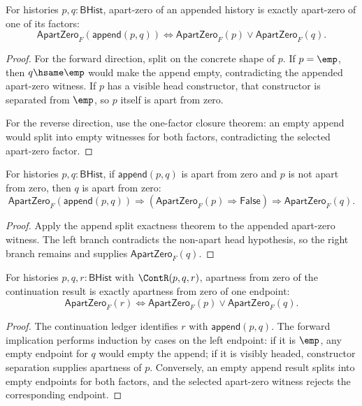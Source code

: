 \begin{theorem}
\label{thm:field-apartzero-append-split-iff}
For histories $p,q:\mathsf{BHist}$, apart-zero of an appended history is
exactly apart-zero of one of its factors:
$$
\mathsf{ApartZero}_F(\mathsf{append}(p,q))
\Longleftrightarrow
\mathsf{ApartZero}_F(p)\lor\mathsf{ApartZero}_F(q).
$$
\end{theorem}
\begin{proof}
For the forward direction, split on the concrete shape of $p$. If
$p=\emp$, then $q\hsame\emp$ would make the append empty, contradicting the
appended apart-zero witness. If $p$ has a visible head constructor, that
constructor is separated from $\emp$, so $p$ itself is apart from zero.

For the reverse direction, use the one-factor closure theorem: an empty append
would split into empty witnesses for both factors, contradicting the selected
apart-zero factor.
\end{proof}

\begin{theorem}
\label{thm:field-apartzero-append-right-factor-of-head-not-apart}
For histories $p,q:\mathsf{BHist}$, if $\mathsf{append}(p,q)$ is apart from
zero and $p$ is not apart from zero, then $q$ is apart from zero:
$$
\mathsf{ApartZero}_F(\mathsf{append}(p,q))
\Longrightarrow
(\mathsf{ApartZero}_F(p)\Rightarrow\mathsf{False})
\Longrightarrow
\mathsf{ApartZero}_F(q).
$$
\end{theorem}
\begin{proof}
Apply the append split exactness theorem to the appended apart-zero witness.
The left branch contradicts the non-apart head hypothesis, so the right branch
remains and supplies $\mathsf{ApartZero}_F(q)$.
\end{proof}

\begin{theorem}
\label{thm:field-apartzero-continuation-endpoint-split}
For histories $p,q,r:\mathsf{BHist}$ with $\ContR(p,q,r)$, apartness from
zero of the continuation result is exactly apartness from zero of one endpoint:
$$
\mathsf{ApartZero}_F(r)
\Longleftrightarrow
\mathsf{ApartZero}_F(p)\lor\mathsf{ApartZero}_F(q).
$$
\end{theorem}
\begin{proof}
The continuation ledger identifies $r$ with $\mathsf{append}(p,q)$. The
forward implication performs induction by cases on the left endpoint: if it is
$\emp$, any empty endpoint for $q$ would empty the append; if it is visibly
headed, constructor separation supplies apartness of $p$. Conversely, an empty
append result splits into empty endpoints for both factors, and the selected
apart-zero witness rejects the corresponding endpoint.
\end{proof}

